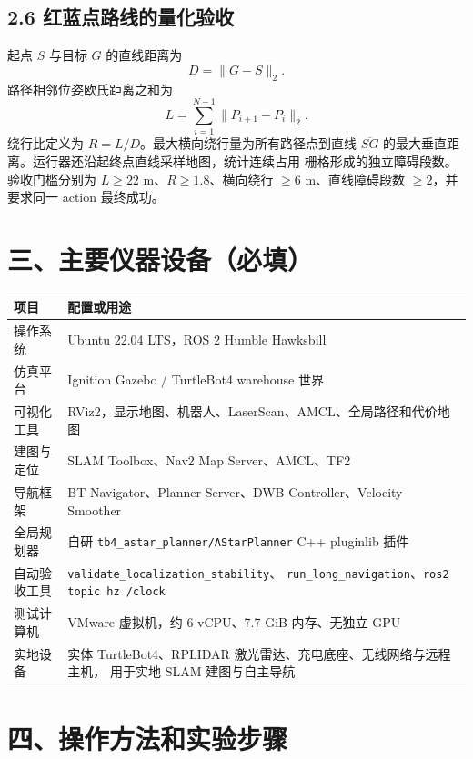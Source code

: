 \documentclass[12pt,a4paper]{ctexart}
\begin{document}
\subsection*{2.6 红蓝点路线的量化验收}

起点 $S$ 与目标 $G$ 的直线距离为
\begin{equation}
  D=\lVert G-S\rVert_2 .
\end{equation}
路径相邻位姿欧氏距离之和为
\begin{equation}
  L=\sum_{i=1}^{N-1}\lVert P_{i+1}-P_i\rVert_2 .
\end{equation}
绕行比定义为 $R=L/D$。最大横向绕行量为所有路径点到直线
$\overline{SG}$ 的最大垂直距离。运行器还沿起终点直线采样地图，统计连续占用
栅格形成的独立障碍段数。验收门槛分别为 $L\geq22$ m、$R\geq1.8$、横向绕行
$\geq6$ m、直线障碍段数 $\geq2$，并要求同一 action 最终成功。

\section*{三、主要仪器设备（必填）}

\begin{longtable}{p{3.2cm}p{10.6cm}}
  \toprule
  项目 & 配置或用途\\
  \midrule
  \endhead
  操作系统 & Ubuntu 22.04 LTS，ROS 2 Humble Hawksbill\\
  仿真平台 & Ignition Gazebo / TurtleBot4 warehouse 世界\\
  可视化工具 & RViz2，显示地图、机器人、LaserScan、AMCL、全局路径和代价地图\\
  建图与定位 & SLAM Toolbox、Nav2 Map Server、AMCL、TF2\\
  导航框架 & BT Navigator、Planner Server、DWB Controller、Velocity Smoother\\
  全局规划器 & 自研 \texttt{tb4\_astar\_planner/AStarPlanner} C++ pluginlib 插件\\
  自动验收工具 & \texttt{validate\_localization\_stability}、
  \texttt{run\_long\_navigation}、\texttt{ros2 topic hz /clock}\\
  测试计算机 & VMware 虚拟机，约 6 vCPU、7.7 GiB 内存、无独立 GPU\\
  实地设备 & 实体 TurtleBot4、RPLIDAR 激光雷达、充电底座、无线网络与远程主机，
  用于实地 SLAM 建图与自主导航\\
  \bottomrule
\end{longtable}

\section*{四、操作方法和实验步骤}
\end{document}
